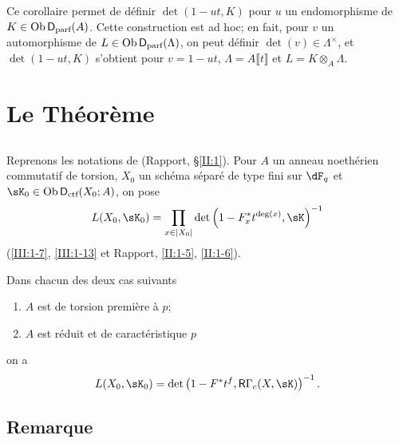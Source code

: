 Ce corollaire permet de définir $\det(1-u t,K)$ pour $u$ un endomorphisme de 
$K\in \operatorname{Ob}\mathsf{D}_\text{parf}(A)$. Cette construction est ad hoc; en fait, pour $v$ un 
automorphisme de $L\in\operatorname{Ob}\mathsf{D}_\text{parf}(\Lambda)$, on peut définir 
$\det(v)\in\Lambda^\times$, et $\det(1-u t,K)$ s'obtient pour $v=1-u t$, 
$\Lambda=A\llbracket t\rrbracket$ et $L=K\otimes_A\Lambda$. 










\section{Le Théorème}\label{III:2}





\subsection{}\label{III:2-1}

Reprenons les notations de (Rapport, \S\ref{II:1}). Pour $A$ un anneau 
noethérien commutatif de torsion, $X_0$ un schéma séparé de type fini sur 
$\dF_q$ et $\sK_0\in\ob\D_\text{ctf}(X_0;A)$, on pose 
\[
  L(X_0,\sK_0) = \prod_{x\in |X_0|} \det\left(1-F_x^* t^{\deg(x)}, \sK\right)^{-1}
\]
(\ref{III:1-7}, \ref{III:1-13} et Rapport, \ref{II:1-5}, \ref{II:1-6}). 





\begin{theorem_}\label{III:2-2}
Dans chacun des deux cas suivants
\begin{enumerate}[\indent a)]
  \item $A$ est de torsion première à $p$;
  \item $A$ est réduit et de caractéristique $p$
\end{enumerate}
on a 
\begin{equation}\label{III:eq:2-2-1}
  L(X_0,\sK_0) = \det\left(1-F^* t^f, \R\Gamma_c(X,\sK)\right)^{-1} \text{.}
\end{equation}
\end{theorem_}





\subsection{Remarque}\label{III:2-3}

